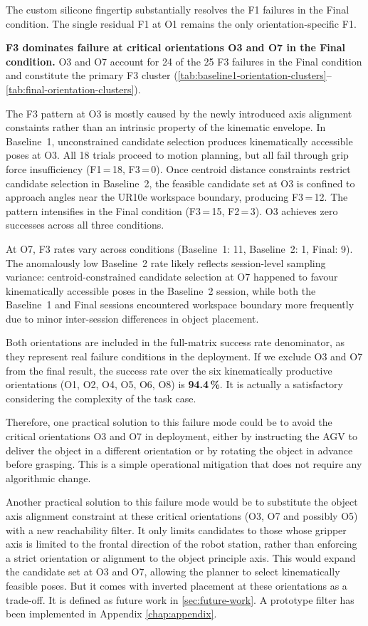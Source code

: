 \documentclass[oneside,studentpaper]{wbk}
\begin{document}
The custom silicone fingertip substantially resolves the F1 failures in the Final condition. The single residual F1 at O1 remains the only orientation-specific F1.

\textbf{F3 dominates failure at critical orientations O3 and O7 in the Final condition.} O3 and O7 account for 24 of the 25 F3 failures in the Final condition and constitute the primary F3 cluster (\cref{tab:baseline1-orientation-clusters}--\cref{tab:final-orientation-clusters}).

The F3 pattern at O3 is mostly caused by the newly introduced axis alignment constaints rather than an intrinsic property of the kinematic envelope. In Baseline~1, unconstrained candidate selection produces kinematically accessible poses at O3. All 18 trials proceed to motion planning, but all fail through grip force insufficiency (F1\,=\,18, F3\,=\,0). Once centroid distance constraints restrict candidate selection in Baseline~2, the feasible candidate set at O3 is confined to approach angles near the UR10e workspace boundary, producing F3\,=\,12. The pattern intensifies in the Final condition (F3\,=\,15, F2\,=\,3). O3 achieves zero successes across all three conditions.

At O7, F3 rates vary across conditions (Baseline~1: 11, Baseline~2: 1, Final: 9). The anomalously low Baseline~2 rate likely reflects session-level sampling variance: centroid-constrained candidate selection at O7 happened to favour kinematically accessible poses in the Baseline~2 session, while both the Baseline~1 and Final sessions encountered workspace boundary more frequently due to minor inter-session differences in object placement.

Both orientations are included in the full-matrix success rate denominator, as they represent real failure conditions in the deployment. If we exclude O3 and O7 from the final result, the success rate over the six kinematically productive orientations (O1, O2, O4, O5, O6, O8) is \textbf{94.4\,\%}. It is actually a satisfactory considering the complexity of the task case.

Therefore, one practical solution to this failure mode could be to avoid the critical orientations O3 and O7 in deployment, either by instructing the AGV to deliver the object in a different orientation or by rotating the object in advance before grasping. This is a simple operational mitigation that does not require any algorithmic change.

Another practical solution to this failure mode would be to substitute the object axis alignment constraint at these critical orientations (O3, O7 and possibly O5) with a new reachability filter. It only limits candidates to those whose gripper axis is limited to the frontal direction of the robot station, rather than enforcing a strict orientation or alignment to the object principle axis. This would expand the candidate set at O3 and O7, allowing the planner to select kinematically feasible poses. But it comes with inverted placement at these orientations as a trade-off. It is defined as future work in \cref{sec:future-work}. A prototype filter has been implemented in Appendix \cref{chap:appendix}.
\end{document}
